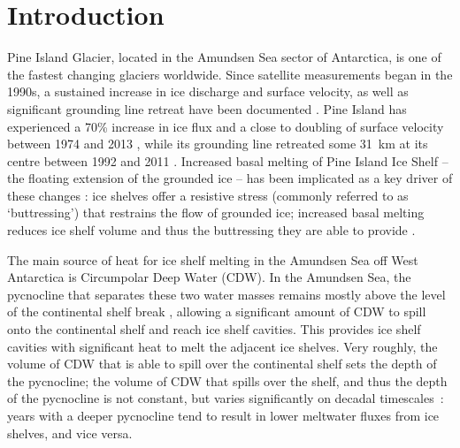 \documentclass[draft]{agujournal2019}
\begin{document}
\section{Introduction}\label{S:Introduction}
Pine Island Glacier, located in the Amundsen Sea sector of Antarctica, is one of the fastest changing glaciers worldwide. Since satellite measurements began in the 1990s, a sustained increase in ice discharge and surface velocity, as well as significant grounding line retreat have been documented \cite{Rignot2002AnnGlac, Rignot2008GRL, Rignot2011Science, Mouginot2014GRL, Gardner2018Cryo}. Pine Island has experienced a 70\% increase in ice flux and a close to doubling of surface velocity between 1974 and 2013 \cite{Mouginot2014GRL}, while its grounding line retreated some 31~km at its centre between 1992 and 2011 \cite{Rignot2014GRL}. Increased basal melting of Pine Island Ice Shelf -- the floating extension of the grounded ice -- has been implicated as a key driver of these changes \cite{Shepherd2004GRL, Pritchard2012Nature, Rignot2019PNAS}: ice shelves offer a resistive stress (commonly referred to as `buttressing') that restrains the flow of grounded ice; increased basal melting reduces ice shelf volume and thus the buttressing they are able to provide \cite{Gudmundsson2013Cryo, Reese2018NatureClimCh, Gudmundsson2019GRL,Gagliardini2010GRL,Goldberg2019GRL, DeRydt2021Cryosphere}.

The main source of heat for ice shelf melting in the Amundsen Sea off West Antarctica is Circumpolar Deep Water (CDW). In the Amundsen Sea, the pycnocline that separates these two water masses remains mostly above the level of the continental shelf break \cite{Jacobs2015Oceanography, Heywood2016Oceanography}, allowing a significant amount of CDW to spill onto the continental shelf and reach ice shelf cavities. This provides ice shelf cavities with significant heat to melt the adjacent ice shelves. Very roughly, the volume of CDW that is able to spill over the continental shelf sets the depth of the pycnocline; the volume of CDW that spills over the shelf, and thus the depth of the pycnocline is not constant, but varies significantly on decadal timescales~\cite{Jenkins2018NatureGeo}: years with a deeper pycnocline tend to result in lower meltwater fluxes from ice shelves, and vice versa.
\end{document}

